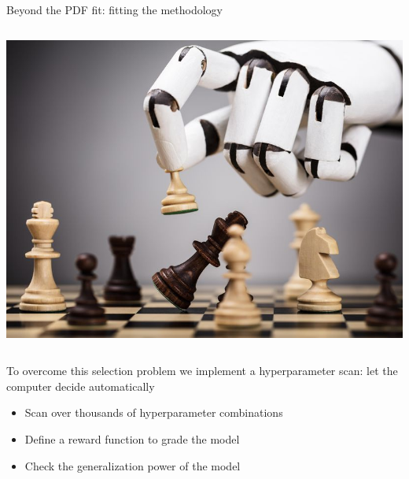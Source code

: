 \begin{frame}{Beyond the PDF fit: fitting the methodology}
\begin{columns}
        \includegraphics[width=\textwidth]{juan_future_hyperopt/alphazero.jpg}
    \end{columns}

    \vspace{0.2cm}

    To overcome this selection problem we implement a {\color{blue}  hyperparameter scan}: let the computer decide automatically

    \begin{itemize}
        \item[\gct] Scan over thousands of hyperparameter combinations
        \item[\gct] Define a reward function to grade the model
        \item[\gct] Check the generalization power of the model
    \end{itemize}

\end{frame}

